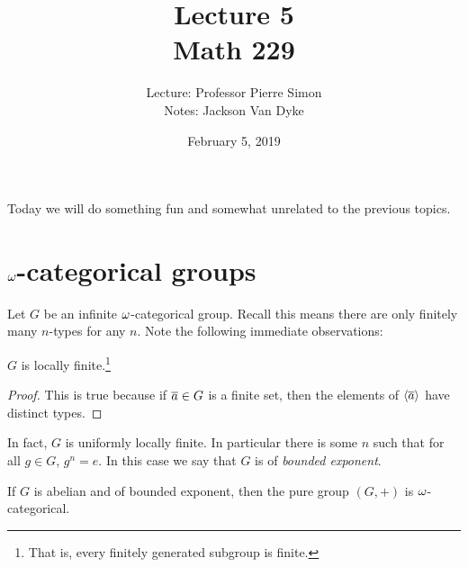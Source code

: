 \documentclass{amsart}
\begin{document}
\title{Lecture 5\\Math 229}
\date{February 5, 2019}
\author{Lecture: Professor Pierre Simon\\Notes: Jackson Van Dyke}
\maketitle

Today we will do something fun and somewhat unrelated to the previous topics.

\section{$\omega$-categorical groups}

Let $G$ be an infinite $\omega$-categorical group.
Recall this means there are only finitely many $n$-types for any $n$.
Note the following immediate observations:

\begin{obs}
$G$ is locally finite.\footnote{
That is, every finitely generated subgroup is finite.}
\end{obs}

\begin{proof}
This is true because if $\overline{a}\in G$ is a finite set, 
then the elements of $\left\langle \overline{a} \right\rangle$ have distinct types.
\end{proof}

In fact, $G$ is uniformly locally finite. In particular there is some $n$ such that
for all $g\in G$, $g^n = e$. In this case we say that $G$ is of \emph{bounded exponent}.

\begin{obs}
If $G$ is abelian and of bounded exponent, then the pure group $\left( G , + \right)$ is
$\omega$-categorical.
\end{obs}
\end{document}
